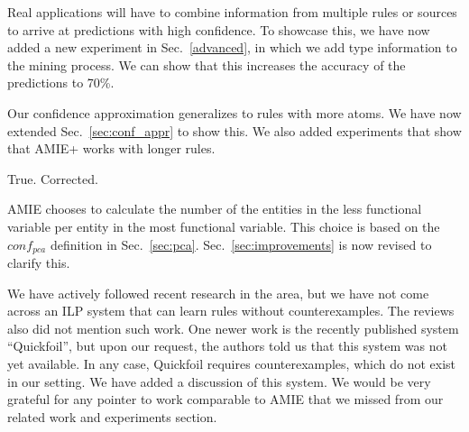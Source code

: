 Real applications will have to combine information from multiple rules or sources to arrive at predictions with high confidence. To showcase this, we have now added a new experiment in Sec.~\ref{advanced}, in which we add type information to the mining process. We can show that this increases the accuracy of the predictions to 70\%.


   Our confidence approximation generalizes to rules with more atoms. We have now extended Sec.~\ref{sec:conf_appr} to show this. We also added experiments that show that AMIE+ works with longer rules.


   True. Corrected.


   AMIE chooses to calculate the number of the entities in the less functional variable per entity in the most functional variable. This choice is based on the $conf_{pca}$ definition in Sec.~\ref{sec:pca}.
   Sec.~\ref{sec:improvements} is now revised to clarify this.


We have actively followed recent research in the area, but we have not come across an ILP system that can learn rules without counterexamples. The reviews also did not mention such work. One newer work is the recently published system ``Quickfoil'', but upon our request, the authors told us that this system was not yet available. In any case, Quickfoil requires counterexamples, which do not exist in our setting. We have added a discussion of this system. We would be very grateful for any pointer to work comparable to AMIE that we missed from our related work and experiments section.


